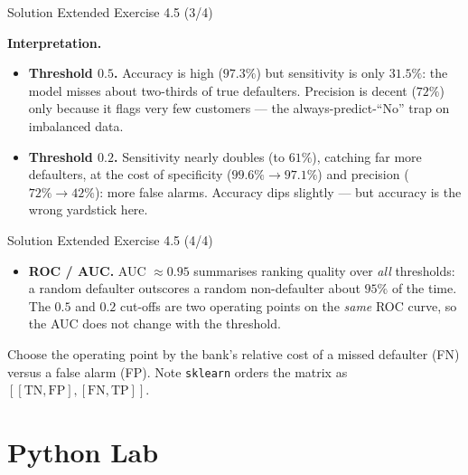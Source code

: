 \documentclass[aspectratio=169,11pt]{beamer}
\begin{document}
\begin{frame}{Solution \textemdash{} Extended Exercise 4.5 (3/4)}
\begin{solutionbox}
\textbf{Interpretation.}
\begin{itemize}
  \item \textbf{Threshold $0.5$.} Accuracy is high ($97.3\%$) but
        sensitivity is only $31.5\%$: the model misses about two-thirds of
        true defaulters. Precision is decent ($72\%$) only because it
        flags very few customers --- the always-predict-``No'' trap on
        imbalanced data.
  \item \textbf{Threshold $0.2$.} Sensitivity nearly doubles (to $61\%$),
        catching far more defaulters, at the cost of specificity
        ($99.6\%\!\to\!97.1\%$) and precision ($72\%\!\to\!42\%$): more
        false alarms. Accuracy dips slightly --- but accuracy is the wrong
        yardstick here.
  \end{itemize}
\end{solutionbox}
\end{frame}

\begin{frame}{Solution \textemdash{} Extended Exercise 4.5 (4/4)}
\begin{solutionbox}
  \begin{itemize}
  \item \textbf{ROC / AUC.} AUC $\approx 0.95$ summarises ranking quality
        over \emph{all} thresholds: a random defaulter outscores a random
        non-defaulter about $95\%$ of the time. The $0.5$ and $0.2$
        cut-offs are two operating points on the \emph{same} ROC curve, so
        the AUC does not change with the threshold.
\end{itemize}
Choose the operating point by the bank's relative cost of a missed
defaulter (FN) versus a false alarm (FP). Note \texttt{sklearn} orders the
matrix as $[[\mathrm{TN},\mathrm{FP}],[\mathrm{FN},\mathrm{TP}]]$.
\end{solutionbox}
\end{frame}

\section{Python Lab}
\end{document}
